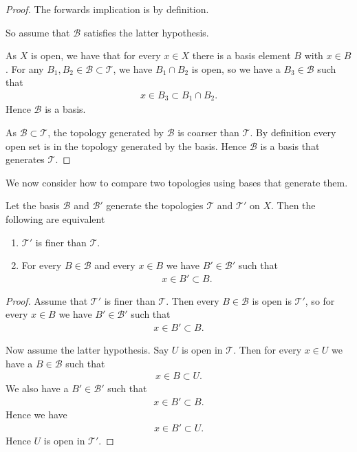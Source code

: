 \documentclass[]{article}
\begin{document}
\begin{proof}
	The forwards implication is by definition. 	

	So assume that $\mathcal{B}$ satisfies the latter hypothesis. 

	As $X$ is open, we have that for every $x \in X$ there is a basis element $B$ with $x \in B$. For any $B_1, B_2 \in \mathcal{B} \subset \mathcal{T}$, we have $B_1 \cap B_2$ is open, so we have a $B_3 \in \mathcal{B}$ such that
	\begin{align*}
			x \in B_3 \subset B_1 \cap B_2.
	\end{align*}
	Hence $\mathcal{B}$ is a basis.

	As $\mathcal{B} \subset \mathcal{T}$, the topology generated by $\mathcal{B}$ is coarser than $\mathcal{T}$. By definition every open set is in the topology generated by the basis. Hence $\mathcal{B}$ is a basis that generates $\mathcal{T}$.
\end{proof}

We now consider how to compare two topologies using bases that generate them.

\begin{thm}
		Let the basis $\mathcal{B}$ and $\mathcal{B}'$ generate the topologies $\mathcal{T}$ and $\mathcal{T}'$ on $X$. Then the following are equivalent
		\begin{enumerate}
				\item $\mathcal{T}'$ is finer than $\mathcal{T}$.
				\item For every $B \in \mathcal{B}$ and every $x \in B$ we have $B' \in \mathcal{B}'$ such that
						\begin{align*}
								x \in B' \subset B.
						\end{align*}
		\end{enumerate}
\end{thm}

\begin{proof}
		Assume that $\mathcal{T}'$ is finer than $\mathcal{T}$.	Then every $B \in \mathcal{B}$ is open is $\mathcal{T}'$, so for every $x \in B$ we have $B' \in \mathcal{B}'$ such that
		\begin{align*}
			x \in B' \subset B.	
		\end{align*}

		Now assume the latter hypothesis. Say $U$ is open in $\mathcal{T}$.  Then for every $x \in U$ we have a $B \in \mathcal{B}$ such that
		\begin{align*}
			x \in B \subset U.	
		\end{align*}
		We also have a $B' \in \mathcal{B}'$ such that
		\begin{align*}
				x \in B' \subset B.
		\end{align*}
		Hence we have
		\begin{align*}
				x \in B' \subset U.
		\end{align*}
		Hence $U$ is open in $\mathcal{T}'$.
\end{proof}
\end{document}
